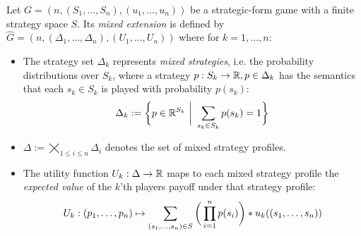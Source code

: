 \documentclass[a4paper]{scrreprt}
\begin{document}
    \begin{defn}
        Let $G = (n, (S_1,\dots, S_n), (u_1, \dots, u_n))$ be a strategic-form game with a finite strategy space $S$. %
        Its \emph{mixed extension} is defined by $\hat{G} = (n, (\Delta_1, \dots, \Delta_n), (U_1, \dots, U_n))$
        where for $k = 1,\dots,n$:
        \begin{itemize} %
%            
%            
            
            \item 
            The strategy set $\Delta_k$ represents \emph{mixed strategies}, i.e. the probability distributions over $S_k$, where a strategy $p : S_k \to \mathbb{R}, p \in \Delta_k$ has the semantics that each $s_k \in S_k$ is played with probability $p(s_k)$:            
            \[
                \Delta_k := \bigg\{ p \in \mathbb{R}^{S_k} ~ \bigg\vert ~ \sum_{s_k \in S_k} p(s_k) = 1 \bigg\} 
            \]
            
            \item $\Delta := \bigtimes\limits_{1\leq i \leq n} \Delta_i$ denotes the set of mixed strategy profiles.
            
            \item
            The utility function $U_k: \Delta \to \mathbb{R}$ maps to each mixed strategy profile the \emph{expected value} of the $k$'th players payoff under that strategy profile:
            \[
                U_k: 
                (p_1, \dots, p_n) 
                \mapsto
                \sum_{(s_1, \dots, s_n) \in S} \bigg(\prod_{i=1}^{n} p(s_i)\bigg) * u_k( (s_1, \dots, s_n) )
            \]
        \end{itemize}
    \end{defn}
    
\end{document}
